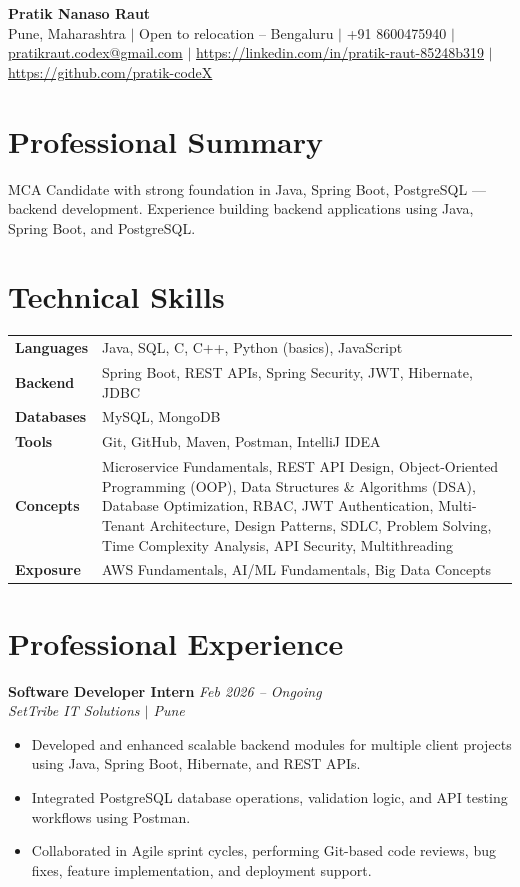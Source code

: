 \documentclass[10.5pt,a4paper]{article}
\begin{document}
\begin{center}
{\Large\bfseries Pratik Nanaso Raut}\\[2pt]
Pune, Maharashtra $|$ Open to relocation -- Bengaluru $|$ +91 8600475940 $|$ \href{mailto:pratikraut.codex@gmail.com}{pratikraut.codex@gmail.com} $|$ \href{https://linkedin.com/in/pratik-raut-85248b319}{https://linkedin.com/in/pratik-raut-85248b319} $|$ \href{https://github.com/pratik-codeX}{https://github.com/pratik-codeX}
\end{center}
\vspace{-2pt}
\section{Professional Summary}
MCA Candidate with strong foundation in Java, Spring Boot, PostgreSQL — backend development. Experience building backend applications using Java, Spring Boot, and PostgreSQL.
\section{Technical Skills}
\begin{tabular}{@{}p{}p{}@{}}
\textbf{Languages} & Java, SQL, C, C++, Python (basics), JavaScript \\[1pt]
\textbf{Backend} & Spring Boot, REST APIs, Spring Security, JWT, Hibernate, JDBC \\[1pt]
\textbf{Databases} & MySQL, MongoDB \\[1pt]
\textbf{Tools} & Git, GitHub, Maven, Postman, IntelliJ IDEA \\[1pt]
\textbf{Concepts} & Microservice Fundamentals, REST API Design, Object-Oriented Programming (OOP), Data Structures \& Algorithms (DSA), Database Optimization, RBAC, JWT Authentication, Multi-Tenant Architecture, Design Patterns, SDLC, Problem Solving, Time Complexity Analysis, API Security, Multithreading \\[1pt]
\textbf{Exposure} & AWS Fundamentals, AI/ML Fundamentals, Big Data Concepts \\
\end{tabular}
\section{Professional Experience}
\textbf{Software Developer Intern} \hfill \textit{Feb 2026 -- Ongoing}
\\\textit{SetTribe IT Solutions $|$ Pune}
\begin{itemize}
  \item Developed and enhanced scalable backend modules for multiple client projects using Java, Spring Boot, Hibernate, and REST APIs.
  \item Integrated PostgreSQL database operations, validation logic, and API testing workflows using Postman.
  \item Collaborated in Agile sprint cycles, performing Git-based code reviews, bug fixes, feature implementation, and deployment support.
\end{itemize}
\end{document}
